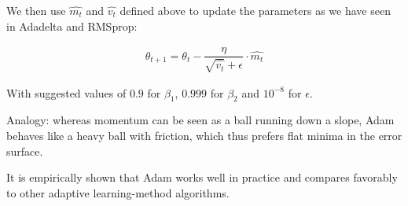 \documentclass[10pt]{article} %
\theoremstyle{question-style}
\begin{document}
\begin{flushleft}
We then use $\hat{m_t}$ and $\hat{v_t}$ defined above to update the parameters as we have seen in Adadelta and RMSprop:

\begin{align*}
    \theta_{t+1} = \theta_t - \dfrac{\eta}{\sqrt{\hat{v_t}} + \epsilon} \cdot \hat{m_t}
\end{align*}

With suggested values of $0.9$ for $\beta_1$, $0.999$ for $\beta_2$ and $10^{-8}$ for $\epsilon$. 

Analogy: whereas momentum can be seen as a ball running down a slope, Adam behaves like a heavy ball with friction, which thus prefers flat minima in the error surface.

It is empirically shown that Adam works well in practice and compares favorably to other adaptive learning-method algorithms.




\end{flushleft}
\end{document}
